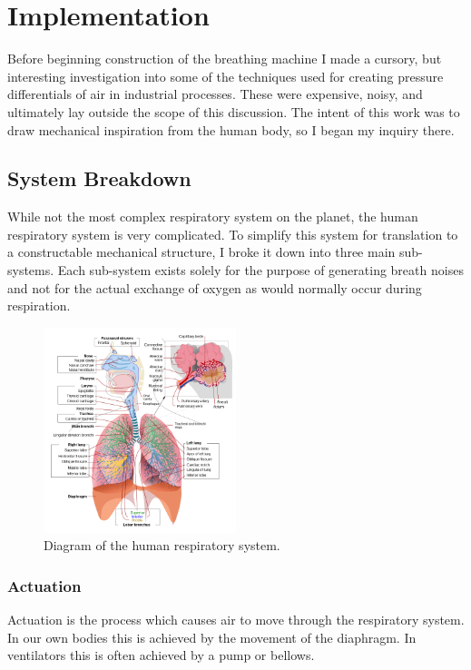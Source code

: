 \documentclass[letterpaper]{article}
\begin{document}
\section{Implementation}

Before beginning construction of the breathing machine I made a cursory, but interesting investigation into some of the techniques used for creating pressure differentials of air in industrial processes. These were expensive, noisy, and ultimately lay outside the scope of this discussion. The intent of this work was to draw mechanical inspiration from the human body, so I began my inquiry there. 

\subsection{System Breakdown}

While not the most complex respiratory system on the planet, the human respiratory system is very complicated.\cite{gasexchangers} To simplify this system for translation to a constructable mechanical structure, I broke it down into three main sub-systems. Each sub-system exists solely for the purpose of generating breath noises and not for the actual exchange of oxygen as would normally occur during respiration.

\begin{figure}[h]
\includegraphics[width=0.5\textwidth]{images/respiratorysystem.png}
\caption{Diagram of the human respiratory system.}
\end{figure}

\subsubsection{Actuation}

Actuation is the process which causes air to move through the respiratory system. In our own bodies this is achieved by the movement of the diaphragm. In ventilators this is often achieved by a pump or bellows.
\end{document}

